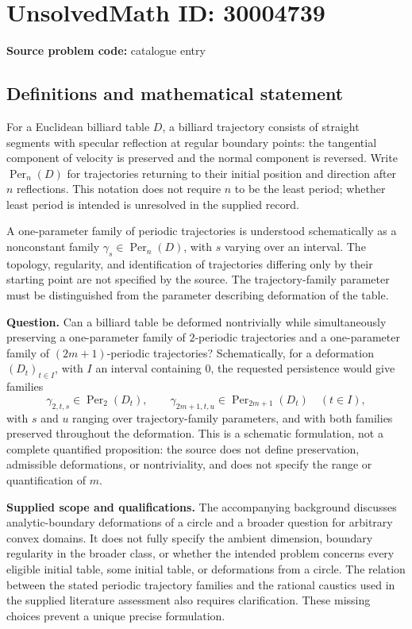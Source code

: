 \documentclass[11pt]{article}
\begin{document}
\section*{UnsolvedMath ID: 30004739}
\textbf{Source problem code:} catalogue entry
\subsection{Definitions and mathematical statement}
For a Euclidean billiard table \(D\), a billiard trajectory consists of straight segments with specular reflection at regular boundary points: the tangential component of velocity is preserved and the normal component is reversed. Write \(\operatorname{Per}_n(D)\) for trajectories returning to their initial position and direction after \(n\) reflections. This notation does not require \(n\) to be the least period; whether least period is intended is unresolved in the supplied record.

A one-parameter family of periodic trajectories is understood schematically as a nonconstant family \(\gamma_s\in\operatorname{Per}_n(D)\), with \(s\) varying over an interval. The topology, regularity, and identification of trajectories differing only by their starting point are not specified by the source. The trajectory-family parameter must be distinguished from the parameter describing deformation of the table.

\textbf{Question.} Can a billiard table be deformed nontrivially while simultaneously preserving a one-parameter family of \(2\)-periodic trajectories and a one-parameter family of \((2m+1)\)-periodic trajectories? Schematically, for a deformation \((D_t)_{t\in I}\), with \(I\) an interval containing \(0\), the requested persistence would give families
\[
\gamma_{2,t,s}\in\operatorname{Per}_2(D_t),\qquad
\gamma_{2m+1,t,u}\in\operatorname{Per}_{2m+1}(D_t)
\quad(t\in I),
\]
with \(s\) and \(u\) ranging over trajectory-family parameters, and with both families preserved throughout the deformation. This is a schematic formulation, not a complete quantified proposition: the source does not define preservation, admissible deformations, or nontriviality, and does not specify the range or quantification of \(m\).

\textbf{Supplied scope and qualifications.} The accompanying background discusses analytic-boundary deformations of a circle and a broader question for arbitrary convex domains. It does not fully specify the ambient dimension, boundary regularity in the broader class, or whether the intended problem concerns every eligible initial table, some initial table, or deformations from a circle. The relation between the stated periodic trajectory families and the rational caustics used in the supplied literature assessment also requires clarification. These missing choices prevent a unique precise formulation.
\end{document}
